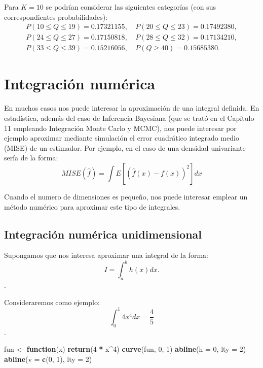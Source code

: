 \documentclass[
]{book}
\newenvironment{Shaded}{\begin{snugshade}}{\end{snugshade}}
\newcommand{\ControlFlowTok}[1]{\textcolor[rgb]{0.13,0.29,0.53}{\textbf{#1}}}
\newcommand{\DataTypeTok}[1]{\textcolor[rgb]{0.13,0.29,0.53}{#1}}
\newcommand{\DecValTok}[1]{\textcolor[rgb]{0.00,0.00,0.81}{#1}}
\newcommand{\KeywordTok}[1]{\textcolor[rgb]{0.13,0.29,0.53}{\textbf{#1}}}
\newcommand{\NormalTok}[1]{#1}
\newcommand{\OperatorTok}[1]{\textcolor[rgb]{0.81,0.36,0.00}{\textbf{#1}}}
\newcommand{\StringTok}[1]{\textcolor[rgb]{0.31,0.60,0.02}{#1}}
\theoremstyle{break}
\theoremstyle{definition}
\theoremstyle{definition}
\theoremstyle{definition}
\theoremstyle{remark}
\begin{document}
Para \(K=10\) se podrían considerar las siguientes categorías (con sus correspondientes probabilidades):
\[\begin{array}{rr}
P( 10 \leq Q \leq 19 ) = 0.17321155, \ & P( 20 \leq Q \leq 23 ) = 0.17492380,\\
P( 24 \leq Q \leq 27 ) = 0.17150818, \ & P( 28 \leq Q \leq 32 ) = 0.17134210,\\
P( 33 \leq Q \leq 39 ) = 0.15216056, \ & P( Q \geq 40 ) =0.15685380.
\end{array}\]

\hypertarget{int-num}{%
\chapter{Integración numérica}\label{int-num}}

En muchos casos nos puede interesar la aproximación de una integral definida.
En estadística, además del caso de Inferencia Bayesiana (que se trató en el Capítulo 11 empleando Integración Monte Carlo y MCMC), nos puede interesar por ejemplo aproximar mediante simulación el error cuadrático integrado medio (MISE) de un estimador.
Por ejemplo, en el caso de una densidad univariante sería de la forma:
\[MISE\left( \hat{f} \right) =\int E\left[ \left( \hat{f}(x) - f(x) \right)^2\right] dx\]

Cuando el numero de dimensiones es pequeño, nos puede interesar emplear un método numérico para aproximar este tipo de integrales.

\hypertarget{integraciuxf3n-numuxe9rica-unidimensional}{%
\section{Integración numérica unidimensional}\label{integraciuxf3n-numuxe9rica-unidimensional}}

Supongamos que nos interesa aproximar una integral de la forma:
\[I = \int_a^b h(x)  dx.\].

Consideraremos como ejemplo:
\[\int_0^1 4x^4 dx = \frac{4}{5}\].

\begin{Shaded}
\begin{Highlighting}[]
\NormalTok{fun <-}\StringTok{ }\ControlFlowTok{function}\NormalTok{(x) }\KeywordTok{return}\NormalTok{(}\DecValTok{4} \OperatorTok{*}\StringTok{ }\NormalTok{x}\OperatorTok{^}\DecValTok{4}\NormalTok{)}
\KeywordTok{curve}\NormalTok{(fun, }\DecValTok{0}\NormalTok{, }\DecValTok{1}\NormalTok{)}
\KeywordTok{abline}\NormalTok{(}\DataTypeTok{h =} \DecValTok{0}\NormalTok{, }\DataTypeTok{lty =} \DecValTok{2}\NormalTok{)}
\KeywordTok{abline}\NormalTok{(}\DataTypeTok{v =} \KeywordTok{c}\NormalTok{(}\DecValTok{0}\NormalTok{, }\DecValTok{1}\NormalTok{), }\DataTypeTok{lty =} \DecValTok{2}\NormalTok{)}
\end{Highlighting}
\end{Shaded}
\end{document}
